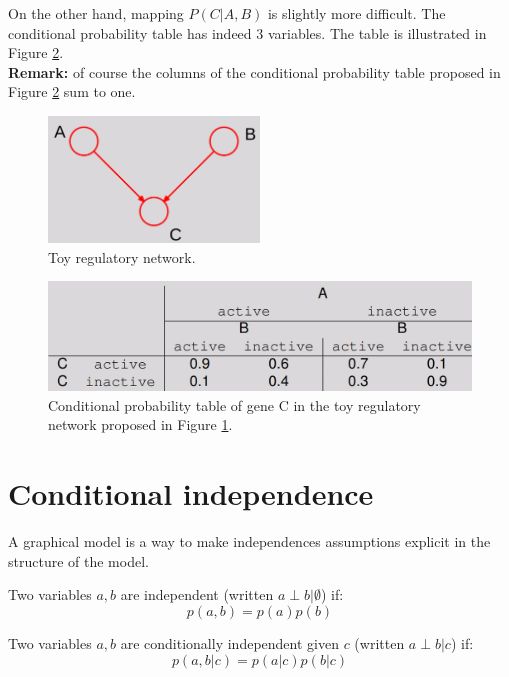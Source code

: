 On the other hand, mapping $P(C|A,B)$ is slightly more difficult. The conditional probability table has indeed 3 variables. The table is illustrated in Figure \ref{fig:geneBayesian_tableC}.\\
\textbf{Remark:} of course the columns of the conditional probability table proposed in Figure \ref{fig:geneBayesian_tableC} sum to one.

\begin{figure}
    \centering
    \includegraphics[width=0.5\textwidth]{images/geneBayesian.png}
    \caption{Toy regulatory network.}
    \label{fig:geneBayesian}
\end{figure}

\begin{figure}
    \centering
    \includegraphics[width=\textwidth]{images/tabellaCGenes.png}
    \caption{Conditional probability table of gene C in the toy regulatory network proposed in Figure \ref{fig:geneBayesian}.}
    \label{fig:geneBayesian_tableC}
\end{figure}

\section{Conditional independence}
A graphical model is a way to make independences assumptions explicit in the structure of the model. \newline

Two variables $a,b$ are independent (written $a \perp b | \emptyset$) if:
\begin{equation}
    p(a,b) = p(a)p(b)
\end{equation}

Two variables $a,b$ are conditionally independent given $c$ (written $a \perp b | c$) if:
\begin{equation}
    \label{conditional_independence}
    p(a,b | c) = p(a|c) p(b|c)
\end{equation}

